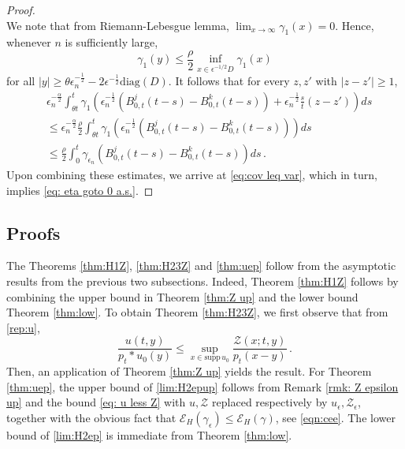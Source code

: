 \documentclass[12pt,reqno]{amsart}
\theoremstyle{remark}
\newcommand{\1}{\mathbf{1}}
\def\Z{\mathcal{Z}}
\def\supp{\mathrm{supp}\,}
\begin{document}
\begin{proof}
\begin{equation*}
			\end{equation*}
			We note that from Riemann-Lebesgue lemma, $\lim_{x\to\infty} \gamma_1(x)=0$.
			Hence, whenever $n$ is sufficiently large, 
			\begin{equation*}
				\gamma_1(y)\le \frac \rho2\inf_{x\in \epsilon^{-1/2} D}\gamma_1(x) 	
			\end{equation*}
			for all $|y|\ge \theta  \epsilon_n^{-\frac12}- 2 \epsilon^{-\frac12} \mathrm{diag}(D)$. It follows that for every $z,z'$ with $|z-z'|\ge1$,
			\begin{align*}
				&\epsilon_n^{-\frac \alpha2}\int_{\theta t}^t \gamma_{1}\left(\epsilon_n^{-\frac12}(B_{0,t}^j(t-s) - B_{0,t}^k(t-s))+ \epsilon_n^{-\frac12}\frac{s}{t} (z-z')\right) ds
				\\&\le\epsilon_n^{-\frac \alpha2}\frac \rho2  \int_{\theta t}^t\gamma_{1}\left(\epsilon_n^{-\frac12}(B_{0,t}^j(t-s) - B_{0,t}^k(t-s))\right) ds
				\\&\le \frac{\rho}{2} \int_{0}^t\gamma_{\epsilon_n}\left(B_{0,t}^j(t-s) - B_{0,t}^k(t-s)\right)ds\,.
			\end{align*}
			Upon combining these estimates, we arrive at \eqref{eq:cov leq var}, which in turn, implies \eqref{eq: eta goto 0 a.s.}. 
		\end{proof}
\subsection{Proofs} %
\label{sec:proof}
The Theorems \ref{thm:H1Z}, \ref{thm:H23Z} and \ref{thm:uep} follow from the asymptotic results from the previous two subsections. Indeed, Theorem \ref{thm:H1Z} follows by combining the upper bound in Theorem \ref{thm:Z up} and the lower bound Theorem \ref{thm:low}. To obtain Theorem \ref{thm:H23Z}, we first observe that from \eqref{rep:u}, 
\begin{equation}\label{eq: u less Z}
\frac{u(t,y)}{p_t*u_0(y)}\leq \sup_{x \in \supp u_0} \frac{\Z(x; t,y)}{p_t(x-y)}\,.
\end{equation}
Then, an application of Theorem \ref{thm:Z up} yields the result. For Theorem \ref{thm:uep}, the upper bound of \eqref{lim:H2epup} follows from Remark \ref{rmk: Z epsilon up} and the bound \eqref{eq: u less Z} with $u,\Z$ replaced respectively by $u_{\epsilon}, \Z_ \epsilon$,  together with the obvious fact that $\mathcal{E}_H(\gamma_{\epsilon})\leq \mathcal{E}_H(\gamma)$, see \eqref{eqn:cee}.  The lower bound of \eqref{lim:H2ep} is immediate from Theorem \ref{thm:low}.
\end{document}
